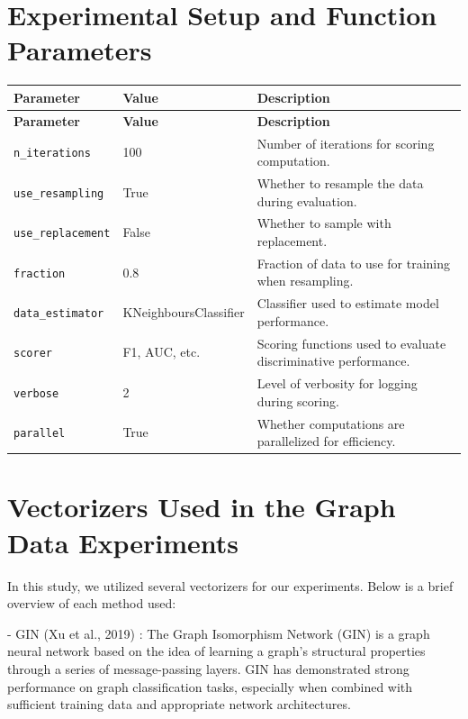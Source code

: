 \section{Experimental Setup and Function Parameters}
\begin{small}
\begin{longtable}{|p{3.2cm}|p{2.5cm}|p{7.2cm}|}
\hline
\textbf{Parameter} & \textbf{Value} & \textbf{Description} \\
\hline
\endfirsthead
\hline
\textbf{Parameter} & \textbf{Value} & \textbf{Description} \\
\hline
\endhead
\hline
\endfoot
\texttt{n\_iterations} & 100 & Number of iterations for scoring computation. \\
\texttt{use\_resampling} & True & Whether to resample the data during evaluation. \\
\texttt{use\_replacement} & False & Whether to sample with replacement. \\
\texttt{fraction} & 0.8 & Fraction of data to use for training when resampling. \\
\texttt{data\_estimator} & KNeighboursClassifier & Classifier used to estimate model performance. \\
\texttt{scorer} & F1, AUC, etc. & Scoring functions used to evaluate discriminative performance. \\
\texttt{verbose} & 2 & Level of verbosity for logging during scoring. \\
\texttt{parallel} & True & Whether computations are parallelized for efficiency. \\
\hline
\end{longtable}
\end{small}

\section{Vectorizers Used in the Graph Data Experiments}
\label{appendix:Vectorizers}

In this study, we utilized several vectorizers for our  experiments. Below is a brief overview of each method used:

- GIN (Xu et al., 2019) \cite{xu2019powerful}: The Graph Isomorphism Network (GIN) is a  graph neural network  based on the idea of learning a graph's structural properties through a series of message-passing layers. GIN has demonstrated strong performance on graph classification tasks, especially when combined with sufficient training data and appropriate network architectures.

